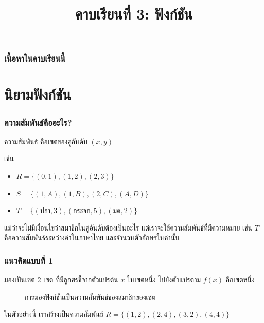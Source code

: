 \title{คาบเรียนที่ 3: ฟังก์ชัน}
\frame{\titlepage}

\begin{frame}
\frametitle{เนื้อหาในคาบเรียนนี้}
\tableofcontents
\end{frame}

\section{นิยามฟังก์ชัน}
\frame{\sectionpage}

\begin{frame}
\end{frame}

\begin{frame}
\frametitle{ความสัมพันธ์คืออะไร?}

\begin{defn}{}{}
ความสัมพันธ์ คือเซตของคู่อันดับ $(x,y)$
\end{defn}
\pa
เช่น 
\begin{itemize}
\item $R = \{(0,1), (1,2), (2,3)\}$
\item $S = \{(1,A), (1,B), (2,C), (A, D)\}$
\item $T = \{(\text{ปลา}, 3), (\text{กระจก}, 5), (\text{มด}, 2)\}$
\end{itemize}
\begin{slide}
แม้ว่าจะไม่มีเงื่อนไขว่าสมาชิกในคู่อันดับต้องเป็นอะไร แต่เราจะใช้ความสัมพันธ์ที่มีความหมาย เช่น $T$ คือความสัมพันธ์ระหว่างคำในภาษาไทย และจำนวนตัวอักษรในคำนั้น
\end{slide}
\end{frame}

\begin{frame}
\frametitle{แนวคิดแบบที่ 1}
มองเป็นเซต 2 เซต ที่มีลูกศรชี้จากตัวแปรต้น $x$ ในเซตหนึ่ง ไปยังตัวแปรตาม $f(x)$ อีกเซตหนึ่ง
\begin{figure}[h!]
\centering
{}
\caption{การมองฟังก์ชันเป็นความสัมพันธ์ของสมาชิกของเซต}
\end{figure}
\begin{slide}
ในตัวอย่างนี้ เราสร้างเป็นความสัมพันธ์ $R = \{(1,2), (2,4), (3,2), (4,4)\}$
\end{slide}
\end{frame}

